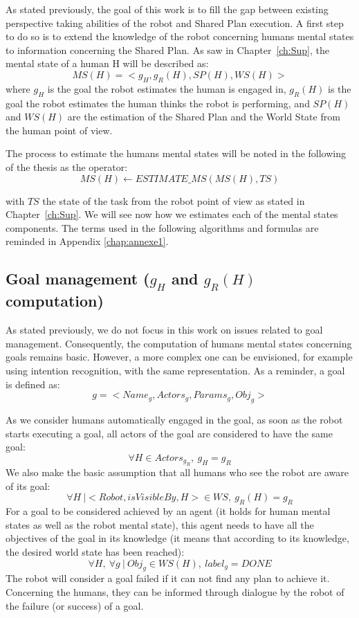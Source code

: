 \documentclass[english,a4paper,11pt,twoside]{StyleThese}
\begin{document}
As stated previously, the goal of this work is to fill the gap between existing perspective taking abilities of the robot and Shared Plan execution. A first step to do so is to extend the knowledge of the robot concerning humans mental states to information concerning the Shared Plan. As saw in Chapter~\ref{ch:Sup}, the mental state of a human H will be described as:
$$MS(H) = <g_H, g_R(H), SP(H), WS(H)>$$
where $g_H$ is the goal the robot estimates the human is engaged in, $g_R(H)$ is the goal the robot estimates the human thinks the robot is performing, and $SP(H)$ and $WS(H)$ are the estimation of the Shared Plan and the World State from the human point of view. 

The process to estimate the humans mental states will be noted in the following of the thesis as the operator:
$$MS(H) \leftarrow ESTIMATE\_MS(MS(H), TS)$$

with $TS$ the state of the task from the robot point of view as stated in Chapter~\ref{ch:Sup}.
We will see now how we estimates each of the mental states components. The terms used in the following algorithms and formulas are reminded in Appendix \ref{chap:annexe1}.

\subsection{Goal management ($g_H$ and $g_R(H)$ computation)}

As stated previously, we do not focus in this work on issues related to goal management. Consequently, the computation of humans mental states concerning goals remains basic. However, a more complex one can be envisioned, for example using intention recognition, with the same representation. As a reminder, a goal is defined as:
$$g = <Name_g, Actors_g, Params_g, Obj_g>$$

As we consider humans automatically engaged in the goal, as soon as the robot starts executing a goal, all actors of the goal are considered to have the same goal:
$$ \forall H \in Actors_{g_R}, \ g_H = g_R$$
We also make the basic assumption that all humans who see the robot are aware of its goal:
$$ \forall H  \ | <Robot, isVisibleBy, H> \in WS, \ g_R(H) = g_R$$
For a goal to be considered achieved by an agent (it holds for human mental states as well as the robot mental state), this agent needs to have all the objectives of the goal in its knowledge (it means that according to its knowledge, the desired world state has been reached):
$$ \forall H, \ \forall g  \ | \ Obj_g \in WS(H), \ label_g = DONE$$
The robot will consider a goal failed if it can not find any plan to achieve it. Concerning the humans, they can be informed through dialogue by the robot of the failure (or success) of a goal.
\end{document}
